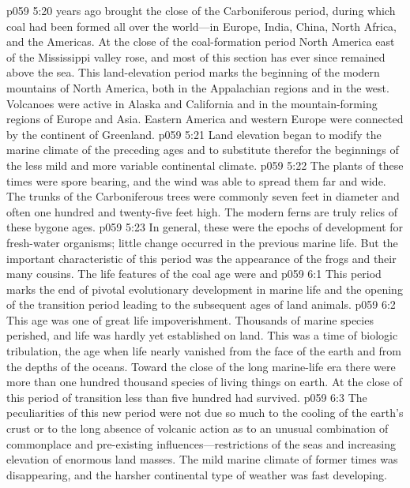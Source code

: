 \pc \vs p059 5:20  years ago brought the close of the Carboniferous period, during which coal had been formed all over the world---in Europe, India, China, North Africa, and the Americas. At the close of the coal\hyp{}formation period North America east of the Mississippi valley rose, and most of this section has ever since remained above the sea. This land\hyp{}elevation period marks the beginning of the modern mountains of North America, both in the Appalachian regions and in the west. Volcanoes were active in Alaska and California and in the mountain\hyp{}forming regions of Europe and Asia. Eastern America and western Europe were connected by the continent of Greenland.
\vs p059 5:21 Land elevation began to modify the marine climate of the preceding ages and to substitute therefor the beginnings of the less mild and more variable continental climate.
\vs p059 5:22 The plants of these times were spore bearing, and the wind was able to spread them far and wide. The trunks of the Carboniferous trees were commonly seven feet in diameter and often one hundred and twenty\hyp{}five feet high. The modern ferns are truly relics of these bygone ages.
\vs p059 5:23 In general, these were the epochs of development for fresh\hyp{}water organisms; little change occurred in the previous marine life. But the important characteristic of this period was the  appearance of the frogs and their many cousins. The life features of the coal age were  and 
\vs p059 6:1 This period marks the end of pivotal evolutionary development in marine life and the opening of the transition period leading to the subsequent ages of land animals.
\vs p059 6:2 This age was one of great life impoverishment. Thousands of marine species perished, and life was hardly yet established on land. This was a time of biologic tribulation, the age when life nearly vanished from the face of the earth and from the depths of the oceans. Toward the close of the long marine\hyp{}life era there were more than one hundred thousand species of living things on earth. At the close of this period of transition less than five hundred had survived.
\vs p059 6:3 The peculiarities of this new period were not due so much to the cooling of the earth’s crust or to the long absence of volcanic action as to an unusual combination of commonplace and pre\hyp{}existing influences---restrictions of the seas and increasing elevation of enormous land masses. The mild marine climate of former times was disappearing, and the harsher continental type of weather was fast developing.

